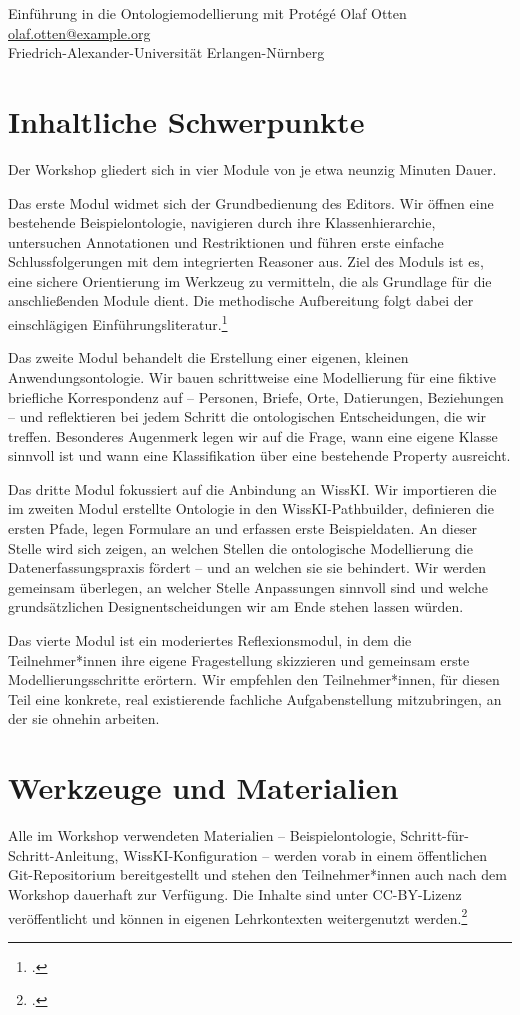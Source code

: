 \begin{beitrag}{Einführung in die Ontologiemodellierung mit Protégé}{%
Olaf Otten\, \\
\small \href{mailto:olaf.otten@example.org}{olaf.otten@example.org} \\
\small Friedrich-Alexander-Universität Erlangen-Nürnberg
}
\section{Inhaltliche Schwerpunkte}
Der Workshop gliedert sich in vier Module von je etwa neunzig Minuten Dauer.

Das erste Modul widmet sich der Grundbedienung des Editors. Wir öffnen eine bestehende Beispielontologie, navigieren durch ihre Klassenhierarchie, untersuchen Annotationen und Restriktionen und führen erste einfache Schlussfolgerungen mit dem integrierten Reasoner aus. Ziel des Moduls ist es, eine sichere Orientierung im Werkzeug zu vermitteln, die als Grundlage für die anschließenden Module dient. Die methodische Aufbereitung folgt dabei der einschlägigen Einführungsliteratur.\footcite[45]{otten2023-protege-handbuch}

Das zweite Modul behandelt die Erstellung einer eigenen, kleinen Anwendungsontologie. Wir bauen schrittweise eine Modellierung für eine fiktive briefliche Korrespondenz auf -- Personen, Briefe, Orte, Datierungen, Beziehungen -- und reflektieren bei jedem Schritt die ontologischen Entscheidungen, die wir treffen. Besonderes Augenmerk legen wir auf die Frage, wann eine eigene Klasse sinnvoll ist und wann eine Klassifikation über eine bestehende Property ausreicht.

Das dritte Modul fokussiert auf die Anbindung an WissKI. Wir importieren die im zweiten Modul erstellte Ontologie in den WissKI-Pathbuilder, definieren die ersten Pfade, legen Formulare an und erfassen erste Beispieldaten. An dieser Stelle wird sich zeigen, an welchen Stellen die ontologische Modellierung die Datenerfassungspraxis fördert -- und an welchen sie sie behindert. Wir werden gemeinsam überlegen, an welcher Stelle Anpassungen sinnvoll sind und welche grundsätzlichen Designentscheidungen wir am Ende stehen lassen würden.

Das vierte Modul ist ein moderiertes Reflexionsmodul, in dem die Teilnehmer*innen ihre eigene Fragestellung skizzieren und gemeinsam erste Modellierungsschritte erörtern. Wir empfehlen den Teilnehmer*innen, für diesen Teil eine konkrete, real existierende fachliche Aufgabenstellung mitzubringen, an der sie ohnehin arbeiten.

\section{Werkzeuge und Materialien}
Alle im Workshop verwendeten Materialien -- Beispielontologie, Schritt-für-Schritt-Anleitung, WissKI-Konfiguration -- werden vorab in einem öffentlichen Git-Repositorium bereitgestellt und stehen den Teilnehmer*innen auch nach dem Workshop dauerhaft zur Verfügung. Die Inhalte sind unter CC-BY-Lizenz veröffentlicht und können in eigenen Lehrkontexten weitergenutzt werden.\footcite{otten2024-workshop-material}


\end{beitrag}
